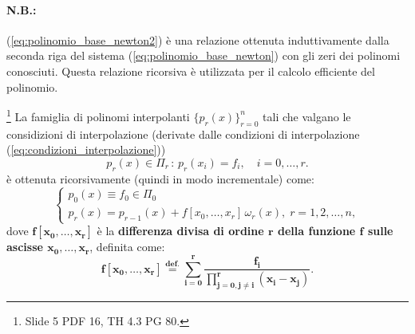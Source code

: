 \paragraph{N.B.:} (\ref{eq:polinomio_base_newton2}) è una relazione ottenuta induttivamente dalla seconda riga del sistema (\ref{eq:polinomio_base_newton}) con gli zeri dei polinomi conosciuti. Questa relazione ricorsiva è utilizzata per il calcolo efficiente del polinomio.

\begin{theorem}\label{th:polinomio_forma_newton}\footnote{Slide 5 PDF 16, TH 4.3 PG 80.}
    La famiglia di polinomi interpolanti $\{p_r(x)\}_{r=0}^n$ tali che valgano le considizioni di interpolazione (derivate dalle condizioni di interpolazione (\ref{eq:condizioni_interpolazione}))
    \begin{equation}\label{eq:condizioni_intepolazione_polinomio_newton}
    	p_r(x)\in\Pi_r\, :\, p_r(x_i)=f_i,\quad i=0,\hdots, r.
    \end{equation}  è ottenuta ricorsivamente (quindi in modo incrementale) come: 
    \begin{equation}\label{eq:famiglia_polinomi_interpolanti}
    \begin{cases}
        p_0(x)\equiv f_0\in\Pi_0\\
        p_r(x) = p_{r-1}(x)+ f[x_0,\hdots, x_r]\,\omega_r(x),\; r=1,2,\hdots, n,
    \end{cases}
    \end{equation}
    dove $\boldsymbol{f[x_0, \hdots, x_r]}$ è la \textbf{differenza divisa di ordine $\boldsymbol r$ della funzione $\boldsymbol f$ sulle ascisse $\boldsymbol{x_0, \hdots, x_r}$}, definita come:
    \begin{equation}\label{eq:differenza_divisa}
       \boldsymbol{f[x_0, \hdots, x_r] \overset{\text{def.}}{=} \sum_{i=0}^r\frac{f_i}{\prod_{j=0, j\neq i}^{r}(x_i-x_j)}}.
    \end{equation}
\end{theorem}
